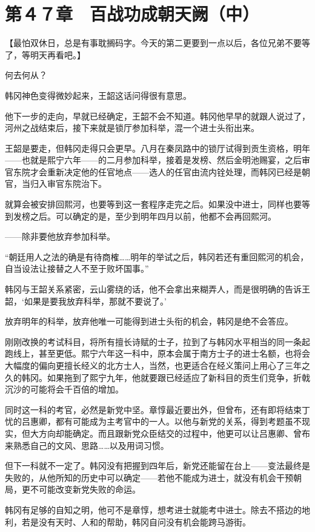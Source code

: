 \section{第４７章　百战功成朝天阙（中）}

【最怕双休日，总是有事耽搁码字。今天的第二更要到一点以后，各位兄弟不要等了，等明天再看吧。】

何去何从？

韩冈神色变得微妙起来，王韶这话问得很有意思。

他下一步的走向，早就已经确定，王韶不会不知道。韩冈他早早的就跟人说过了，河州之战结束后，接下来就是锁厅参加科举，混一个进士头衔出来。

王韶是要走，但韩冈走得只会更早。八月在秦凤路中的锁厅试得到贡生资格，明年——也就是熙宁六年——的二月参加科举，接着是发榜、然后金明池赐宴，之后审官东院才会重新决定他的任官地点——选人的任官由流内铨处理，而韩冈已经是朝官，当归入审官东院治下。

就算会被安排回熙河，也要等到这一套程序走完之后。如果没中进士，同样也要等到发榜之后。可以确定的是，至少到明年四月以前，他都不会再回熙河。

——除非要他放弃参加科举。

“朝廷用人之法的确是有待商榷……明年的举试之后，韩冈若还有重回熙河的机会，自当设法让接替之人不至于败坏国事。”

韩冈与王韶关系紧密，云山雾绕的话，他不会拿出来糊弄人，而是很明确的告诉王韶，‘如果是要我放弃科举，那就不要说了。’

放弃明年的科举，放弃他唯一可能得到进士头衔的机会，韩冈是绝不会答应。

刚刚改换的考试科目，将所有擅长诗赋的士子，拉到了与韩冈水平相当的同一条起跑线上，甚至更低。熙宁六年这一科中，原本会属于南方士子的进士名额，也将会大幅度的偏向更擅长经义的北方士人，当然，也更适合在经义策问上用心了三年之久的韩冈。如果拖到了熙宁九年，他就要跟已经适应了新科目的贡生们竞争，折戟沉沙的可能将会千百倍的增加。

同时这一科的考官，必然是新党中坚。章惇最近要出外，但曾布，还有即将结束丁忧的吕惠卿，都有可能成为主考官中的一人。以他与新党的关系，得到考题虽不现实，但大方向却能确定。而且跟新党众臣结交的过程中，他更可以让吕惠卿、曾布来熟悉自己的文风、思路……以及用词习惯。

但下一科就不一定了。韩冈没有把握到四年后，新党还能留在台上——变法最终是失败的，从他所知的历史中可以确定——若他不能成为进士，就没有机会干预朝局，更不可能改变新党失败的命运。

韩冈有足够的自知之明，他可不是章惇，想考进士就能考中进士。除去不搭边的地利，若是没有天时、人和的帮助，韩冈自问没有机会能跨马游街。

